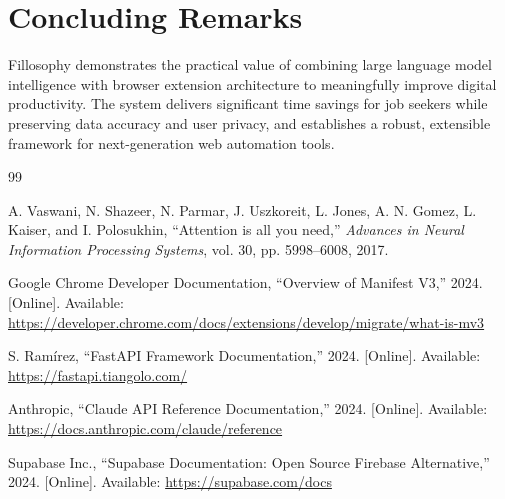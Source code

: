 \documentclass[12pt,a4paper]{report}
\begin{document}
\section{Concluding Remarks}
Fillosophy demonstrates the practical value of combining large language model intelligence with browser extension architecture to meaningfully improve digital productivity. The system delivers significant time savings for job seekers while preserving data accuracy and user privacy, and establishes a robust, extensible framework for next-generation web automation tools.

\begin{thebibliography}{99}

A. Vaswani, N. Shazeer, N. Parmar, J. Uszkoreit, L. Jones, A. N. Gomez, L. Kaiser, and I. Polosukhin,
``Attention is all you need,''
\textit{Advances in Neural Information Processing Systems}, vol. 30, pp. 5998--6008, 2017.

Google Chrome Developer Documentation,
``Overview of Manifest V3,'' 2024. [Online]. Available: \url{https://developer.chrome.com/docs/extensions/develop/migrate/what-is-mv3}

S. Ramírez,
``FastAPI Framework Documentation,'' 2024. [Online]. Available: \url{https://fastapi.tiangolo.com/}

Anthropic,
``Claude API Reference Documentation,'' 2024. [Online]. Available: \url{https://docs.anthropic.com/claude/reference}

Supabase Inc.,
``Supabase Documentation: Open Source Firebase Alternative,'' 2024. [Online]. Available: \url{https://supabase.com/docs}

\end{thebibliography}
\end{document}
